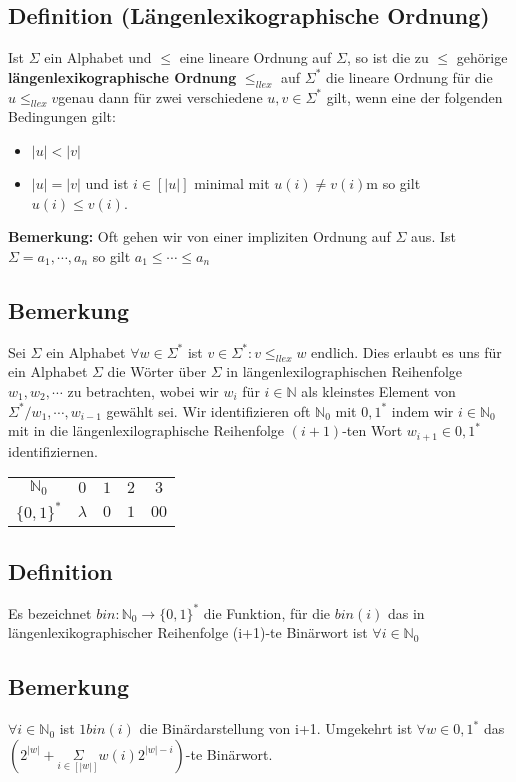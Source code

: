\documentclass[a4paper,11pt]{article}
\begin{document}
\subsection{Definition (Längenlexikographische Ordnung)} Ist $\Sigma$ ein Alphabet und $\leq $ eine lineare Ordnung auf $\Sigma$, so ist die zu $\leq $ gehörige \textbf{längenlexikographische Ordnung} $\leq_{llex}$ auf $\Sigma^{*}$ die lineare Ordnung für die $u \leq_{llex} v $genau dann für zwei verschiedene $u, v\in \Sigma^{*}$ gilt, wenn eine der folgenden Bedingungen gilt:
\begin{itemize}
    \item $\lvert u \rvert < \lvert v \rvert$
    \item $\lvert u \rvert = \lvert v \rvert$ und ist $i \in [|u|]$ minimal mit 
    $u(i) \neq v(i)$m so gilt $u(i) \leq v(i)$.
\end{itemize}
\textbf{Bemerkung: }Oft gehen wir von einer impliziten Ordnung auf $\Sigma$ aus. Ist $\Sigma = {a_{1}, \cdots, a_{n}}$ so gilt $a_{1}\leq \cdots \leq a_{n}$

\subsection{Bemerkung} Sei $\Sigma$ ein Alphabet $\forall w \in \Sigma^{*}$ ist ${v\in \Sigma^{*} : v \leq_{llex}w}$ endlich. Dies erlaubt es uns für ein Alphabet $\Sigma$ die Wörter über $\Sigma$ in längenlexilographischen Reihenfolge $w_{1}, w_{2}, \cdots$ zu betrachten, wobei wir $w_{i}$ für $i \in \mathbb{N}$ als kleinstes Element von $\Sigma^{*}/{w_{1},\cdots, w_{i-1}}$ gewählt sei. Wir identifizieren oft $\mathbb{N}_{0}$ mit ${0, 1}^{*}$ indem wir $i \in \mathbb{N}_{0}$ mit in die längenlexilographische Reihenfolge $(i+1)$-ten Wort $w_{i+1} \in {0,1}^{*}$ identifiziernen.
\begin{center}
    \begin{tabular}{ c c c c c }
        $\mathbb{N}_{0}$ & $0$ & $1$ & $2$ & $3$\\ 
        $\{0, 1\}^{*}$ & $\lambda$ & $0$ & $1$ & $00$\\   
    \end{tabular}
\end{center}

\subsection{Definition} Es bezeichnet $bin : \mathbb{N}_{0} \rightarrow \{0, 1\}^{*}$ die Funktion, für die $bin(i)$ das in längenlexikographischer Reihenfolge (i+1)-te Binärwort ist $\forall i \in \mathbb{N}_{0}$

\subsection{Bemerkung}
$\forall i \in \mathbb{N}_{0}$ ist $1 bin(i)$ die Binärdarstellung von i+1. Umgekehrt ist $\forall w \in {0, 1}^{*}$ das $(2^{|w|} + \underset{i \in [|w|]}{\Sigma} w(i) 2^{|w|-i})$-te Binärwort.
\end{document}
